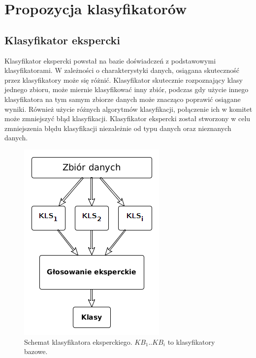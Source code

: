 \chapter{Propozycja klasyfikatorów}
\section{Klasyfikator ekspercki}
Klasyfikator ekspercki powstał na bazie doświadczeń z podstawowymi klasyfikatorami. W zależności o charakterystyki danych, osiągana skuteczność przez klasyfikatory może się różnić. Klasyfikator skutecznie rozpoznający klasy jednego zbioru, może miernie klasyfikować inny zbiór, podczas gdy użycie innego klasyfikatora na tym samym zbiorze danych może znacząco poprawić osiągane wyniki. Również użycie różnych algorytmów klasyfikacji, połączenie ich w komitet może zmniejszyć błąd klasyfikacji. 
Klasyfikator ekspercki został stworzony w celu zmniejszenia błędu klasyfikacji niezależnie od typu danych oraz nieznanych danych. \par
\begin{figure}[h]
	\centering
	\includegraphics[width=\textwidth]{./images/klas_ekspercki.png}
	\caption{Schemat klasyfikatora eksperckiego. $KB_1..KB_i$ to klasyfikatory bazowe.}
	\label{fig:klasyfikator_ekspercki}
\end{figure}
